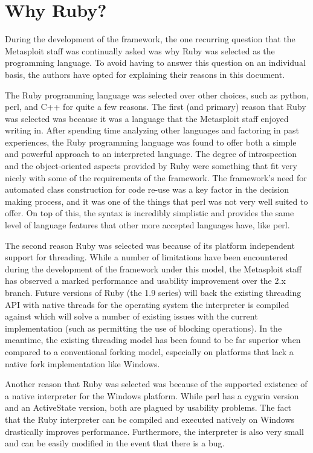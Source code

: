 \documentclass{report}
\begin{document}
    \section{Why Ruby?}

\par
During the development of the framework, the one recurring question
that the Metasploit staff was continually asked was why Ruby was
selected as the programming language.  To avoid having to answer
this question on an individual basis, the authors have opted for
explaining their reasons in this document.

\par
The Ruby programming language was selected over other choices, such
as python, perl, and C++ for quite a few reasons.  The first (and
primary) reason that Ruby was selected was because it was a language
that the Metasploit staff enjoyed writing in. After spending time
analyzing other languages and factoring in past experiences, the
Ruby programming language was found to offer both a simple and
powerful approach to an interpreted language.  The degree of
introspection and the object-oriented aspects provided by Ruby were
something that fit very nicely with some of the requirements of the
framework.  The framework's need for automated class construction
for code re-use was a key factor in the decision making process, and
it was one of the things that perl was not very well suited to
offer. On top of this, the syntax is incredibly simplistic and
provides the same level of language features that other more
accepted languages have, like perl.

\par
The second reason Ruby was selected was because of its platform
independent support for threading.  While a number of limitations
have been encountered during the development of the framework under
this model, the Metasploit staff has observed a marked performance
and usability improvement over the 2.x branch.  Future versions of
Ruby (the 1.9 series) will back the existing threading API with
native threads for the operating system the interpreter is compiled
against which will solve a number of existing issues with the
current implementation (such as permitting the use of blocking
operations).  In the meantime, the existing threading model has been
found to be far superior when compared to a conventional forking
model, especially on platforms that lack a native fork
implementation like Windows.

\par
Another reason that Ruby was selected was because of the supported
existence of a native interpreter for the Windows platform.  While
perl has a cygwin version and an ActiveState version, both are
plagued by usability problems.  The fact that the Ruby interpreter
can be compiled and executed natively on Windows drastically
improves performance.  Furthermore, the interpreter is also very
small and can be easily modified in the event that there is a bug.
\end{document}
